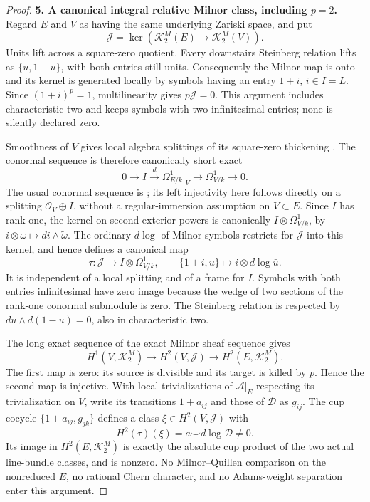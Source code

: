 \begin{proof}
\textbf{5. A canonical integral relative Milnor class, including $p=2$.}
Regard $E$ and $V$ as having the same underlying Zariski space, and put
\[
 \mathcal J=\ker(\mathcal K_2^M(E)\to\mathcal K_2^M(V)).
\]
Units lift across a square-zero quotient. Every downstairs Steinberg
relation lifts as $\{u,1-u\}$, with both entries still units.
Consequently the Milnor map is onto and its kernel is generated
locally by symbols having an entry $1+i$, $i\in I=L$.
Since $(1+i)^p=1$, multilinearity gives $p\mathcal J=0$.
This argument includes characteristic two and keeps symbols with two
infinitesimal entries; none is silently declared zero.

Smoothness of $V$ gives local algebra splittings of its square-zero
thickening \citep[Definition 10.138.1 and Proposition 10.138.13]{frStacksFormalSmoothRelativeMilnor}. The conormal sequence is therefore canonically short exact
\[
 0\longrightarrow I\xrightarrow{d}\Omega^1_{E/k}|_V
             \longrightarrow\Omega^1_{V/k}\longrightarrow0.
 \tag{C.3bj.16}
\]
The usual conormal sequence is \citet[Lemma 10.131.9, Tag 00RU]{D_StacksConormalUniformHigher};
its left injectivity here follows directly on a splitting
$\mathcal O_V\oplus I$, without a regular-immersion assumption on $V\subset E$.
Since $I$ has rank one, the kernel on second exterior powers is
canonically $I\otimes\Omega^1_{V/k}$, by $i\otimes\omega\mapsto di\wedge\widetilde\omega$.
The ordinary $d\log$ of Milnor symbols restricts for $\mathcal J$ into
this kernel, and hence defines a canonical map
\[
 \tau:\mathcal J\longrightarrow I\otimes\Omega^1_{V/k},\qquad
 \{1+i,u\}\longmapsto i\otimes d\log\bar u.
 \tag{C.3bj.17}
\]
It is independent of a local splitting and of a frame for $I$.
Symbols with both entries infinitesimal have zero image because the
wedge of two sections of the rank-one conormal submodule is zero.
The Steinberg relation is respected by $du\wedge d(1-u)=0$,
also in characteristic two.

The long exact sequence of the exact Milnor sheaf sequence gives
\[
 H^1(V,\mathcal K_2^M)\longrightarrow H^2(V,\mathcal J)
       \longrightarrow H^2(E,\mathcal K_2^M).
\]
The first map is zero: its source is divisible and its target is
killed by $p$. Hence the second map is injective. With local
trivializations of $\mathcal A|_E$ respecting its trivialization on
$V$, write its transitions $1+a_{ij}$ and those of $\mathcal D$ as
$g_{ij}$. The cup cocycle $\{1+a_{ij},g_{jk}\}$ defines a class
$\xi\in H^2(V,\mathcal J)$ with
\[
 H^2(\tau)(\xi)=a\smile d\log\mathcal D\ne0.
 \tag{C.3bj.18}
\]
Its image in $H^2(E,\mathcal K_2^M)$ is exactly the absolute cup
product of the two actual line-bundle classes, and is nonzero.
No Milnor--Quillen comparison on the nonreduced $E$, no rational
Chern character, and no Adams-weight separation enter this argument.


\end{proof}

